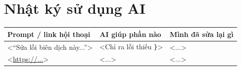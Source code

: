 \documentclass[12pt,a4paper]{article}
\begin{document}
\section{Nhật ký sử dụng AI}
\begin{table}[H]
  \centering
  \begin{tabular}{p{4.2cm}p{5cm}p{5cm}}
    \toprule
    Prompt / link hội thoại & AI giúp phần nào & Mình đã sửa lại gì \\
    \midrule
    <``Sửa lỗi biên dịch này...''> & <Chỉ ra lỗi thiếu \texttt{\}}> & <...> \\
    <\url{https://...}>             & <...>                            & <...> \\
    \bottomrule
  \end{tabular}
\end{table}
\end{document}
